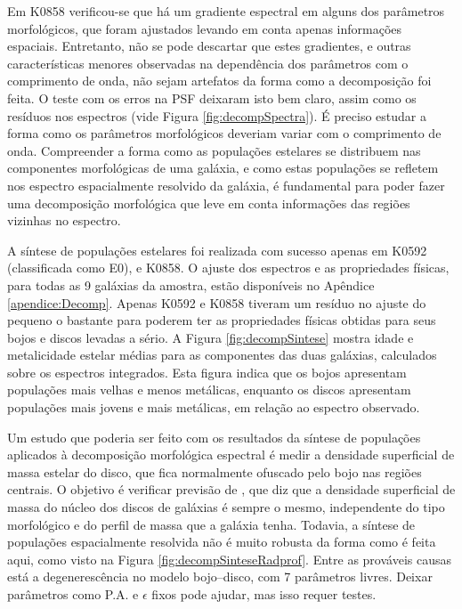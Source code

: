 Em K0858 verificou-se que há um gradiente espectral em alguns dos parâmetros
morfológicos, que foram ajustados levando em conta apenas informações espaciais.
Entretanto, não se pode descartar que estes gradientes, e outras características
menores observadas na dependência dos parâmetros com o comprimento de onda, não
sejam artefatos da forma como a decomposição foi feita. O teste com os erros na
PSF deixaram isto bem claro, assim como os resíduos nos espectros (vide Figura
\ref{fig:decompSpectra}). É preciso estudar a forma como os parâmetros
morfológicos deveriam variar com o comprimento de onda. Compreender a forma como
as populações estelares se distribuem nas componentes morfológicas de uma
galáxia, e como estas populações se refletem nos espectro espacialmente
resolvido da galáxia, é fundamental para poder fazer uma decomposição
morfológica que leve em conta informações das regiões vizinhas no espectro.

A síntese de populações estelares foi realizada com sucesso apenas em K0592
(classificada como E0), e K0858. O ajuste dos espectros e as propriedades
físicas, para todas as 9 galáxias da amostra, estão disponíveis no Apêndice
\ref{apendice:Decomp}. Apenas K0592 e K0858 tiveram um resíduo no ajuste do
\starlight pequeno o bastante para poderem ter as propriedades físicas obtidas
para seus bojos e discos levadas a sério. A Figura \ref{fig:decompSintese}
mostra idade e metalicidade estelar médias para as componentes das duas
galáxias, calculados sobre os espectros integrados. Esta figura indica que os
bojos apresentam populações mais velhas e menos metálicas, enquanto os discos
apresentam populações mais jovens e mais metálicas, em relação ao espectro
observado.

Um estudo que poderia ser feito com os resultados da síntese de populações
aplicados à decomposição morfológica espectral é medir a densidade superficial
de massa estelar do disco, que fica normalmente ofuscado pelo bojo nas regiões
centrais. O objetivo é verificar previsão de \citet{Freeman1970}, que diz que a
densidade superficial de massa do núcleo dos discos de galáxias é sempre o
mesmo, independente do tipo morfológico e do perfil de massa que a galáxia
tenha. Todavia, a síntese de populações espacialmente resolvida não é muito
robusta da forma como é feita aqui, como visto na Figura
\ref{fig:decompSinteseRadprof}. Entre as prováveis causas está a degenerescência
no modelo bojo--disco, com 7 parâmetros livres. Deixar parâmetros como P.A. e
$\epsilon$ fixos pode ajudar, mas isso requer testes.

